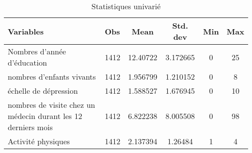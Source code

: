 \documentclass[a4paper]{article}
\begin{document}
	\begin{table}[h!]
		\centering
		\begin{tabular}{|l|l|c|c|c|c|}
			\hline
			\textbf{Variables} & \textbf{Obs} & \textbf{Mean} & \textbf{Std. dev}  & \textbf{Min} & \textbf{Max}  \\ 
			\hline
			Nombres d’année d'éducation & 1412 & 12.40722 & 3.172665 & 0 & 25 \\
			\hline
			nombres d'enfants vivants & 1412 & 1.956799 & 1.210152 & 0 & 8 \\
			\hline
			échelle de dépression & 1412 & 1.588527 & 1.676945 & 0 & 10 \\
			\hline
			nombres de visite chez un médecin durant les 12 derniers mois  & 1412 & 6.822238 & 8.005508 & 0 & 98  \\
			\hline
			Activité physiques  & 1412 & 2.137394 &	1.26484 & 1	& 4  \\
			\hline
			
			
		\end{tabular}
		\caption{Statistiques univarié}
		\label{tab:2}
	\end{table}
	
\end{document}
